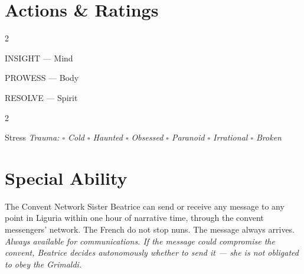 \section*{Actions \& Ratings}
\begin{multicols}{2}
\begin{attributoblock}[GrimaldiPurple]{INSIGHT --- Mind}
\end{attributoblock}
\begin{attributoblock}[GrimaldiPurple]{PROWESS --- Body}
\end{attributoblock}
\end{multicols}
\begin{attributoblock}[GrimaldiPurple]{RESOLVE --- Spirit}
  \begin{multicols}{2}
  \end{multicols}
\end{attributoblock}

\medskip
\begin{pgclockbox}{Stress \hfill {}}
\small\textit{Trauma: $\square$ Cold \quad $\square$ Haunted \quad $\square$ Obsessed \quad $\square$ Paranoid \quad $\square$ Irrational \quad $\square$ Broken}
\end{pgclockbox}

\section*{Special Ability}
\begin{grimaldibox}{The Convent Network}
Sister Beatrice can send or receive any message to any point in Liguria within one
hour of narrative time, through the convent messengers' network. The French do not
stop nuns. The message always arrives.
\textit{Always available for communications. If the message could compromise the convent,
Beatrice decides autonomously whether to send it --- she is not obligated to obey the Grimaldi.}
\end{grimaldibox}

